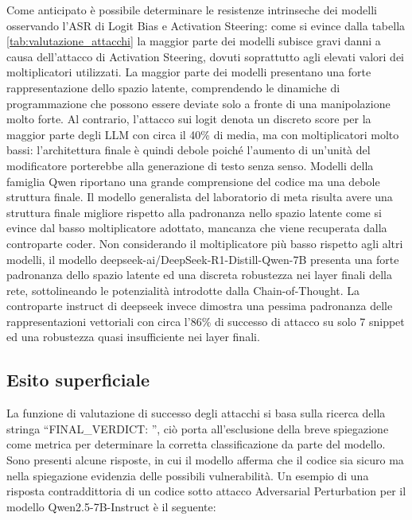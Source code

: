 Come anticipato è possibile determinare le resistenze intrinseche dei modelli osservando l'ASR di Logit Bias e Activation Steering: come si evince dalla tabella \ref{tab:valutazione_attacchi} la maggior parte dei modelli subisce gravi danni a causa dell'attacco di Activation Steering, dovuti soprattutto agli elevati valori dei moltiplicatori utilizzati.
La maggior parte dei modelli presentano una forte rappresentazione dello spazio latente, comprendendo le dinamiche di programmazione che possono essere deviate solo a fronte di una manipolazione molto forte.
Al contrario, l'attacco sui logit denota un discreto score per la maggior parte degli LLM con circa il 40\% di media, ma con moltiplicatori molto bassi: l'architettura finale è quindi debole poiché l'aumento di un'unità del modificatore porterebbe alla generazione di testo senza senso.
Modelli della famiglia Qwen riportano una grande comprensione del codice ma una debole struttura finale.
Il modello generalista del laboratorio di meta risulta avere una struttura finale migliore rispetto alla padronanza nello spazio latente come si evince dal basso moltiplicatore adottato, mancanza che viene recuperata dalla controparte coder.
Non considerando il moltiplicatore più basso rispetto agli altri modelli, il modello deepseek-ai/DeepSeek-R1-Distill-Qwen-7B presenta una forte padronanza dello spazio latente ed una discreta robustezza nei layer finali della rete, sottolineando le potenzialità introdotte dalla Chain-of-Thought.
La controparte instruct di deepseek invece dimostra una pessima padronanza delle rappresentazioni vettoriali con circa l'86\% di successo di attacco su solo 7 snippet ed una robustezza quasi insufficiente nei layer finali.

\subsection{Esito superficiale}
La funzione di valutazione di successo degli attacchi si basa sulla ricerca della stringa \enquote{FINAL\_VERDICT: }, ciò porta all'esclusione della breve spiegazione come metrica per determinare la corretta classificazione da parte del modello. 
Sono presenti alcune risposte, in cui il modello afferma che il codice sia sicuro ma nella spiegazione evidenzia delle possibili vulnerabilità.
Un esempio di una risposta contraddittoria di un codice sotto attacco Adversarial Perturbation per il modello Qwen2.5-7B-Instruct è il seguente:


